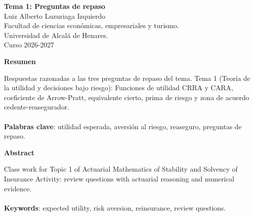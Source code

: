 \documentclass[a4paper,12pt]{article}
\begin{document}
\begin{titlepage}
    \centering
    \vspace*{0.1cm}
    \huge\textbf{Tema 1: Preguntas de repaso}\\
    \vspace{1cm}
    \small{Luiz Alberto Luzuriaga Izquierdo}\\
    \vspace{0.1cm}
    Facultad de ciencias económicas, empresariales y turismo. \\
    \vspace{0.1cm}
    Universidad de Alcalá de Henares. \\
    \vspace{0.1cm}
    Curso 2026-2027\\
    \vspace{0.5cm}

{\bfseries Resumen}

\vspace{0.1cm}
\noindent
\begin{justify}
Respuestas razonadas a las tres preguntas de repaso del tema. Tema 1 (Teoría de la utilidad y decisiones bajo riesgo): Funciones de utilidad CRRA y CARA, coeficiente de Arrow-Pratt, equivalente cierto, prima de riesgo y zona de acuerdo cedente-reasegurador.\\\\
\vspace{0.1cm}
\noindent
\textbf{Palabras clave}: utilidad esperada, aversión al riesgo, reaseguro, preguntas de repaso.
\end{justify}
\begin{center}
    {\bfseries Abstract}
\end{center}
\vspace{0.1cm}
\noindent
\begin{justify}
Class work for Topic 1 of Actuarial Mathematics of Stability and Solvency of Insurance Activity: review questions with actuarial reasoning and numerical evidence.\\\\
\vspace{0.1cm}
\noindent
\textbf{Keywords}: expected utility, risk aversion, reinsurance, review questions.
\end{justify}

\end{titlepage}

\newpage{}
\renewcommand{\contentsname}{Índice}
\tableofcontents
\end{document}
